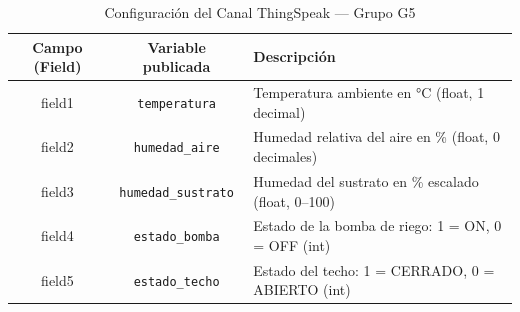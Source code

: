\begin{table}[tp]
\centering
\renewcommand{\arraystretch}{1.3}
\caption{Configuración del Canal ThingSpeak --- Grupo G5}
\label{tab:thingspeak_campos}
\begin{tabularx}{\textwidth}{|c|c|X|}
\hline
\textbf{Campo (Field)} & \textbf{Variable publicada} & \textbf{Descripción} \\
\hline
field1 & \texttt{temperatura} & Temperatura ambiente en °C (float, 1 decimal) \\
\hline
field2 & \texttt{humedad\_aire} & Humedad relativa del aire en \% (float, 0 decimales) \\
\hline
field3 & \texttt{humedad\_sustrato} & Humedad del sustrato en \% escalado (float, 0--100) \\
\hline
field4 & \texttt{estado\_bomba} & Estado de la bomba de riego: 1 = ON, 0 = OFF (int) \\
\hline
field5 & \texttt{estado\_techo} & Estado del techo: 1 = CERRADO, 0 = ABIERTO (int) \\
\hline
\end{tabularx}
\end{table}